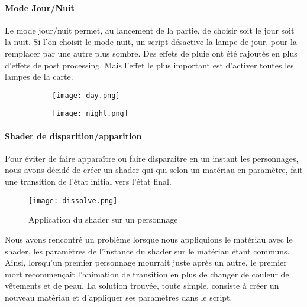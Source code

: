         \paragraph{Mode Jour/Nuit}
        Le mode jour/nuit permet, au lancement de la partie,
        de choisir soit le jour soit la nuit. Si l'on choisit le mode nuit, un script désactive la lampe de jour,
        pour la remplacer par une autre plus sombre. Des effets de pluie ont été rajoutés en plus d'effets de post processing.
        Mais l'effet le plus important est d'activer toutes les lampes de la carte.
    

        \begin{figure}[hbt!]
            \begin{subfigure}[b]{0.49\textwidth}
                \texttt{[image: day.png]}
            \end{subfigure}
            \begin{subfigure}[b]{0.5\textwidth}
                \texttt{[image: night.png]}
            \end{subfigure}
            \caption{}
        \end{figure}
        \FloatBarrier

        \paragraph{Shader de disparition/apparition}
        Pour éviter de faire apparaître ou faire disparaitre en un instant les personnages, nous avons décidé de créer un shader qui qui selon un matériau en paramètre, 
        fait une transition de l'état initial vers l'état final. 
        \begin{figure}[hbt!]
            \centering
            \texttt{[image: dissolve.png]}
            \caption{Application du shader sur un personnage}

        \end{figure}
        \FloatBarrier

        Nous avons rencontré un problème lorsque nous appliquions le matériau avec le shader,
        les paramètres de l'instance du shader sur le matériau étant communs. Ainsi, lorsqu'un premier personnage mourrait juste après un autre, 
        le premier mort recommençait l'animation de transition en plus de changer de couleur de vêtements et de peau.
        La solution trouvée, toute simple, consiste à créer un nouveau matériau et d'appliquer  ses paramètres dans le script.


